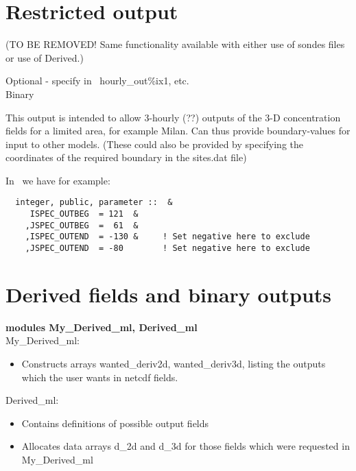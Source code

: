 \section{Restricted output}
(TO BE REMOVED! Same functionality available with either use of
sondes files or use of Derived.)

\noindent
Optional -  specify in \MyOutputs\, hourly\_out\%ix1, etc.\\
Binary
\vspace{1cm}

This output is intended to allow 3-hourly (??) outputs of the 3-D concentration
fields for a limited area, for example Milan. Can thus provide boundary-values
for input to other models. (These could also be provided by specifying the
coordinates of the required boundary in the sites.dat file)

In \MyOutputs\ we have for example:

\begin{small}\begin{verbatim}
  integer, public, parameter ::  &
	 ISPEC_OUTBEG  = 121  &
	,JSPEC_OUTBEG  =  61  &
	,ISPEC_OUTEND  = -130 &     ! Set negative here to exclude
	,JSPEC_OUTEND  = -80        ! Set negative here to exclude
\end{verbatim}
\end{small}


\section{Derived fields and binary outputs}

{\bf modules My\_Derived\_ml, Derived\_ml}\\

My\_Derived\_ml:\\
\begin{itemize}
  \item Constructs arrays wanted\_deriv2d, wanted\_deriv3d, listing
   the outputs which the user wants in netcdf fields.
\end{itemize}

Derived\_ml:\\
\begin{itemize}
  \item Contains definitions of possible output fields
  \item Allocates data arrays d\_2d and d\_3d for those
    fields which were requested in My\_Derived\_ml	
\end{itemize}




